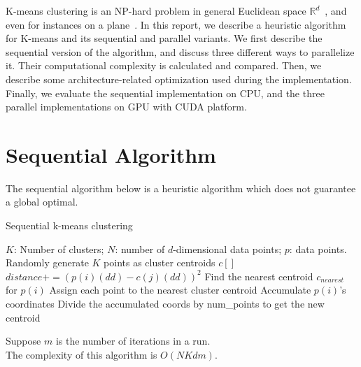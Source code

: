 K-means clustering is an NP-hard problem in general Euclidean space 
$\mathbb{R}^d$~\cite{k-means-euclidean},
and even for instances on a plane~\cite{k-means-plane}. 
In this report, we describe a heuristic algorithm for K-means and its 
sequential and parallel variants.
We first describe the sequential version of the algorithm, and discuss three 
different ways to parallelize it. Their computational complexity is calculated and
compared.
Then, we describe some architecture-related optimization used during
the implementation.
Finally, we evaluate the sequential implementation on CPU,
and the three parallel implementations on GPU with CUDA platform.

\section{Sequential Algorithm}
The sequential algorithm below is a heuristic algorithm which does not guarantee
a global optimal. 

\begin{algorithm}
  \caption{Sequential k-means clustering} \label{seq}
  \begin{algorithmic}[1]
    \INPUT $K$: Number of clusters; $N$: number of $d$-dimensional data points; $p$: data points. 
    \State Randomly generate $K$ points as cluster centroids $c[]$
    \State $distance += (p(i)(dd) - c(j)(dd))^2$
    \EndFor
    \EndFor
    \State Find the nearest centroid $c_{nearest}$ for $p(i)$
    \State Assign each point to the nearest cluster centroid
    \State Accumulate $p(i)$'s coordinates
    \State Divide the accumulated coords by num\_points to get the new centroid
    \EndFor
    \EndWhile
    \EndFunction
  \end{algorithmic}
\end{algorithm}

\vspace{5mm}
\noindent
Suppose $m$ is the number of iterations in a run. \\
The complexity of this algorithm is $O(NKdm)$. 
